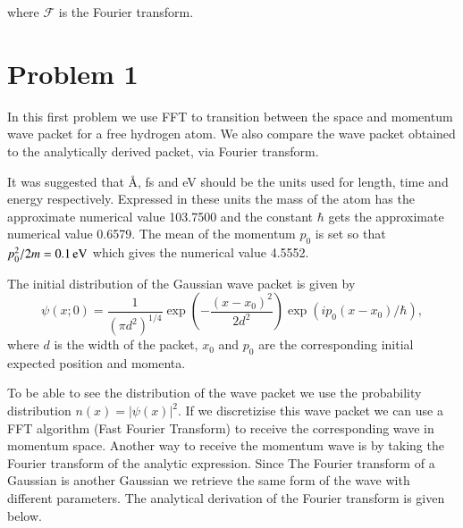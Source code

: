 where $\mathcal{F}$ is the Fourier transform\cite{probdesc}. 

\section*{Problem 1}

In this first problem we use FFT to transition between the space and momentum wave packet for a free hydrogen atom. We also compare the wave packet obtained to the analytically derived packet, via Fourier transform.

It was suggested that \AA, fs and eV should be the units used for length, time and energy respectively. Expressed in these units the mass of the atom has the approximate numerical value 103.7500 and the constant $\hbar$ gets the approximate numerical value 0.6579. The mean of the momentum $p_0$ is set so that $p_0^2/2m=\unit[0.1]{eV}$ which gives the numerical value 4.5552.

The initial distribution of the Gaussian wave packet is given by
\begin{equation}
	\psi(x;0)=\frac{1}{(\pi d^2)^{1/4}} \exp\left(-\frac{(x-x_0)^2}{2d^2}\right) \exp(i p_0(x-x_0)/\hbar),
\end{equation}
where $d$ is the width of the packet, $x_0$ and $p_0$ are the corresponding initial expected position and momenta.

To be able to see the distribution of the wave packet we use the probability distribution $n(x)=|\psi(x)|^2$. If we discretizise this wave packet we can use a FFT algorithm (Fast Fourier Transform) to receive the corresponding wave in momentum space. Another way to receive the momentum wave is by taking the Fourier transform of the analytic expression. Since The Fourier transform of a Gaussian is another Gaussian we retrieve the same form of the wave with different parameters. The analytical derivation of the Fourier transform is given below.

